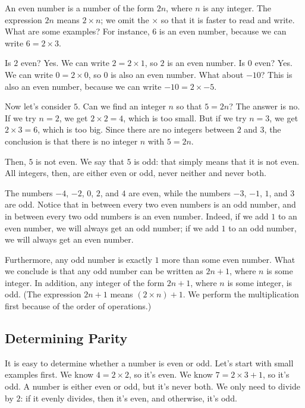 \documentclass[a4paper,10pt]{report}
\begin{document}
An \gls{even} number is a number of the form \(2n\), where \(n\) is any
integer. The expression \(2n\) means \(2\times n\); we omit the \(\times\) so
that it is faster to read and write. What are some examples? For instance,
\(6\) is an even number, because we can write \(6 = 2 \times 3\).

Is \(2\) even? Yes. We can write \(2 = 2 \times 1\), so \(2\) is an even
number. Is \(0\) even? Yes. We can write \(0 = 2 \times 0\), so \(0\) is also
an even number. What about \(-10\)? This is also an even number, because we can
write \(-10 = 2 \times -5\).

Now let's consider \(5\). Can we find an integer \(n\) so that \(5 = 2n\)? The
answer is no. If we try \(n = 2\), we get \(2 \times 2 = 4\), which is too
small. But if we try \(n = 3\), we get \(2 \times 3 = 6\), which is too big.
Since there are no integers between \(2\) and \(3\), the conclusion is that
there is no integer \(n\) with \(5 = 2n\).

Then, \(5\) is not even. We say that \(5\) is \gls{odd}: that simply means that
it is not even. All integers, then, are either even or odd, never neither and
never both.

The numbers \(-4\), \(-2\), \(0\), \(2\), and \(4\) are even, while the numbers
\(-3\), \(-1\), \(1\), and \(3\) are odd. Notice that in between every two even
numbers is an odd number, and in between every two odd numbers is an even
number. Indeed, if we add \(1\) to an even number, we will always get an odd
number; if we add \(1\) to an odd number, we will always get an even number.

Furthermore, any odd number is exactly \(1\) more than some even number. What
we conclude is that any odd number can be written as \(2n+1\), where \(n\) is
some integer. In addition, any integer of the form \(2n+1\), where \(n\) is
some integer, is odd. (The expression \(2n+1\) means \((2\times n) + 1\). We
perform the multiplication first because of the order of operations.)

\subsection{Determining Parity}

It is easy to determine whether a number is even or odd. Let's start with small
examples first. We know \(4=2\times2\), so it's even. We know \(7=2\times3+1\),
so it's odd. A number is either even or odd, but it's never both. We only need
to divide by \(2\): if it evenly divides, then it's even, and otherwise, it's
odd.
\end{document}
